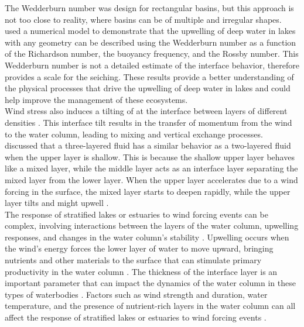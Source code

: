 \documentclass[tesis.tex]{subfiles}
\begin{document}
The Wedderburn number was design for rectangular basins, but this approach is not too close to reality, where basins can be of multiple and irregular shapes. \cite{Shintani2010} used a numerical model to demonstrate that the upwelling of deep water in lakes with any geometry can be described using the Wedderburn number as a function of the Richardson number, the buoyancy frequency, and the Rossby number. This Wedderburn number is not a detailed estimate of the interface behavior, therefore provides a scale for the seiching. These results provide a better understanding of the physical processes that drive the upwelling of deep water in lakes and could help improve the management of these ecosystems.\\

Wind stress also induces a tilting of at the interface between layers of different densities \citep{Monismith1985}. This interface tilt results in the transfer of momentum from the wind to the water column, leading to mixing and vertical exchange processes.\\

\cite{Monismith1985} discussed that a three-layered fluid has a similar behavior as a two-layered fluid when the upper layer is shallow. This is because the shallow upper layer behaves like a mixed layer, while the middle layer acts as an interface layer separating the mixed layer from the lower layer. When the upper layer accelerates due to a wind forcing in the surface, the mixed layer starts to deepen rapidly, while the upper layer tilts and might upwell \citep{monismith2006vertical}.\\

The response of stratified lakes or estuaries to wind forcing events can be complex, involving interactions between the layers of the water column, upwelling responses, and changes in the water column's stability \citep{jayaweera2019turbulent}. Upwelling occurs when the wind's energy forces the lower layer of water to move upward, bringing nutrients and other materials to the surface that can stimulate primary productivity in the water column \citep{bastidas2021comparison}. The thickness of the interface layer is an important parameter that can impact the dynamics of the water column in these types of waterbodies \citep{xu2017vertical}. Factors such as wind strength and duration, water temperature, and the presence of nutrient-rich layers in the water column can all affect the response of stratified lakes or estuaries to wind forcing events \citep{nidheesh2018stratification}.\\
\end{document}
